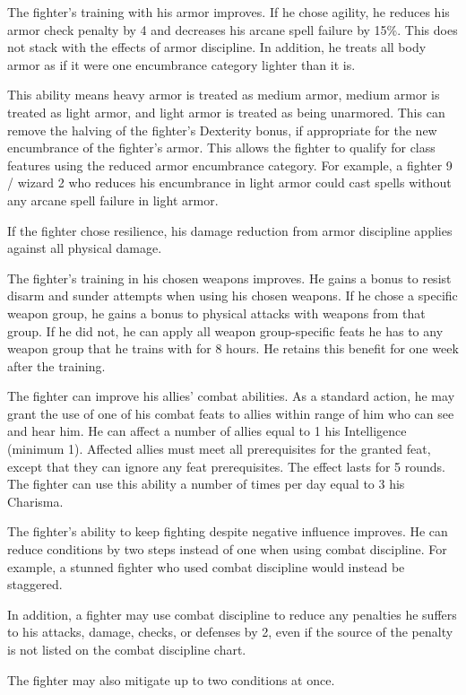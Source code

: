  The fighter's training with his armor improves. If he chose agility, he reduces his armor check penalty by 4 and decreases his arcane spell failure by 15\%. This does not stack with the effects of armor discipline. In addition, he treats all body armor as if it were one encumbrance category lighter than it is.
\par This ability means heavy armor is treated as medium armor, medium armor is treated as light armor, and light armor is treated as being unarmored. This can remove the halving of the fighter's Dexterity bonus, if appropriate for the new encumbrance of the fighter's armor. This allows the fighter to qualify for class features using the reduced armor encumbrance category. For example, a fighter 9 / wizard 2 who reduces his encumbrance in light armor could cast spells without any arcane spell failure in light armor.

If the fighter chose resilience, his damage reduction from armor discipline applies against all physical damage.

 The fighter's training in his chosen weapons improves. He gains a  bonus to resist disarm and sunder attempts when using his chosen weapons. If he chose a specific weapon group, he gains a  bonus to physical attacks with weapons from that group. If he did not, he can apply all weapon group-specific feats he has to any weapon group that he trains with for 8 hours. He retains this benefit for one week after the training.

 The fighter can improve his allies' combat abilities. As a standard action, he may grant the use of one of his combat feats to allies within \rngclose range of him who can see and hear him. He can affect a number of allies equal to 1 \add his Intelligence (minimum 1). Affected allies must meet all prerequisites for the granted feat, except that they can ignore any feat prerequisites. The effect lasts for 5 rounds. The fighter can use this ability a number of times per day equal to 3 \add his Charisma.

 The fighter's ability to keep fighting despite negative influence improves. He can reduce conditions by two steps instead of one when using combat discipline. For example, a stunned fighter who used combat discipline would instead be staggered.
\par In addition, a fighter may use combat discipline to reduce any penalties he suffers to his attacks, damage, checks, or defenses by 2, even if the source of the penalty is not listed on the combat discipline chart.
\par The fighter may also mitigate up to two conditions at once.

